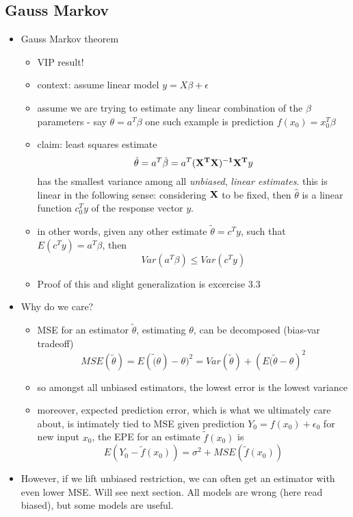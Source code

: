 \subsection{Gauss Markov}
 \begin{itemize}
 \item {\blue Gauss Markov theorem}
   \begin{itemize}
     \item VIP result!
     \item context: assume linear model $ y = X\beta + \epsilon$
     \item assume we are trying to estimate any linear combination of the $\beta$ parameters - say $\theta = a^T\beta$
       \subitem one such example is prediction $f(x_0) = x_0^T\beta$
     \item claim: least squares estimate 
       $$ \hat{\theta} = a^T \hat{\beta} = a^T {\bf (X^TX)^{-1}X^T}y $$
       has the smallest variance among all \emph{unbiased}, \emph{linear estimates}.
       \subitem this is linear in the following sense: considering ${\bf X}$ to be fixed, then $\hat{\theta}$ is a linear function $c_0^Ty$ of the response vector $y$.
     \item in other words, given any other estimate $\tilde{\theta} = c^Ty$, such that $E(c^Ty) = a^T\beta$, then
       $$ Var(a^T\beta) \leq Var(c^Ty) $$
     \item Proof of this and slight generalization is excercise 3.3
   \end{itemize}
 \item Why do we care?
   \begin{itemize}
     \item MSE for an estimator $\tilde{\theta}$, estimating $\theta$, can be decomposed (bias-var tradeoff)
       $$ MSE(\tilde{\theta}) = E(\tilde(\theta) - \theta)^2 = Var(\tilde{\theta}) + \left(E(\tilde{\theta} - \theta\right)^2 $$
       \item so amongst all unbiased estimators, the lowest error is the lowest variance
       \item moreover, expected prediction error, which is what we ultimately care about, is intimately tied to MSE
	 \subitem given prediction $Y_0 = f(x_0) + \epsilon_0$ for new input $x_0$, the EPE for an estimate $\tilde{f}(x_0)$ is
	 $$ E(Y_0 - \tilde{f}(x_0)) = \sigma^2 + MSE(\tilde{f}(x_0)) $$
   \end{itemize}
 \item However, if we lift unbiased restriction, we can often get an estimator with even lower MSE. Will see next section.
   \subitem All models are wrong (here read biased), but some models are useful.
\end{itemize}

